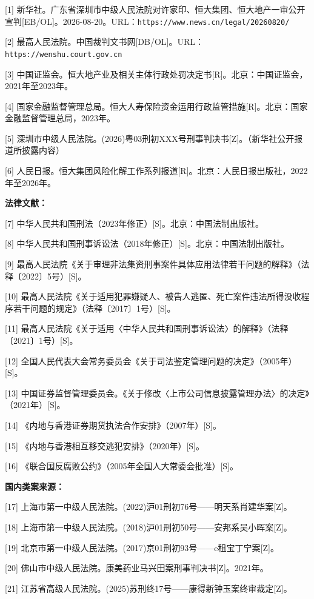 \documentclass[11pt,a4paper,oneside,openany]{article}
\begin{document}
[1] 新华社。广东省深圳市中级人民法院对许家印、恒大集团、恒大地产一审公开宣判[EB/OL]。2026-08-20。URL：\texttt{https://www.news.cn/legal/20260820/}

[2] 最高人民法院。中国裁判文书网[DB/OL]。URL：\texttt{https://wenshu.court.gov.cn}

[3] 中国证监会。恒大地产业及相关主体行政处罚决定书[R]。北京：中国证监会，2021年至2023年。

[4] 国家金融监督管理总局。恒大人寿保险资金运用行政监管措施[R]。北京：国家金融监督管理总局，2023年。

[5] 深圳市中级人民法院。(2026)粤03刑初XXX号刑事判决书[Z]。（新华社公开报道所披露内容）

[6] 人民日报。恒大集团风险化解工作系列报道[R]。北京：人民日报出版社，2022年至2026年。

\textbf{法律文献：}

[7] 中华人民共和国刑法（2023年修正）[S]。北京：中国法制出版社。

[8] 中华人民共和国刑事诉讼法（2018年修正）[S]。北京：中国法制出版社。

[9] 最高人民法院《关于审理非法集资刑事案件具体应用法律若干问题的解释》（法释〔2022〕5号）[S]。

[10] 最高人民法院《关于适用犯罪嫌疑人、被告人逃匿、死亡案件违法所得没收程序若干问题的规定》（法释〔2017〕1号）[S]。

[11] 最高人民法院《关于适用〈中华人民共和国刑事诉讼法〉的解释》（法释〔2021〕1号）[S]。

[12] 全国人民代表大会常务委员会《关于司法鉴定管理问题的决定》（2005年）[S]。

[13] 中国证券监督管理委员会。《关于修改〈上市公司信息披露管理办法〉的决定》（2021年）[S]。

[14] 《内地与香港证券期货执法合作安排》（2007年）[S]。

[15] 《内地与香港相互移交逃犯安排》（2020年）[S]。

[16] 《联合国反腐败公约》（2005年全国人大常委会批准）[S]。

\textbf{国内类案来源：}

[17] 上海市第一中级人民法院。(2022)沪01刑初76号——明天系肖建华案[Z]。

[18] 上海市第一中级人民法院。(2018)沪01刑初50号——安邦系吴小晖案[Z]。

[19] 北京市第一中级人民法院。(2017)京01刑初93号——e租宝丁宁案[Z]。

[20] 佛山市中级人民法院。康美药业马兴田案刑事判决书[Z]。2021年。

[21] 江苏省高级人民法院。(2025)苏刑终17号——康得新钟玉案终审裁定[Z]。
\end{document}
